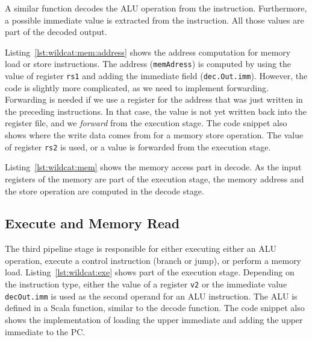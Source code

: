 \documentclass[%
    10pt,
    headinclude, footinclude=false,
    openright, %
    notitlepage,
    cleardoublepage=empty,
    headsepline,
    numbers=noenddot,
    bibliography=totoc, index=totoc,
    ]{scrbook}
\newcommand{\code}[1]{{\lstinline[basicstyle=\small\ttfamily]{#1}}}
\begin{document}

A similar function decodes the ALU operation from the instruction. Furthermore, a possible
immediate value is extracted from the instruction. All those values are part of the
decoded output.

Listing~\ref{lst:wildcat:mem:address} shows the address computation for memory
load or store instructions. The address (\code{memAdress}) is computed by using the value of
register \code{rs1} and adding the immediate field (\code{dec.Out.imm}).
However, the code is slightly more complicated, as we need to implement forwarding.
Forwarding is needed if we use a register for the address that was just written in
the preceding instructions. In that case, the value is not yet written back into the register
file, and we \emph{forward} from the execution stage.
The code snippet also shows where the write data comes from for a memory store operation.
The value of register \code{rs2} is used, or a value is forwarded from the execution
stage.


Listing~\ref{lst:wildcat:mem} shows the memory access part in decode.
As the input registers of the memory are part of the execution stage, the memory address
and the store operation are computed in the decode stage.



 
\subsection{Execute and Memory Read}

The third pipeline stage is responsible for either executing either an ALU operation, execute
a control instruction (branch or jump), or perform a memory load.
Listing~\ref{lst:wildcat:exe} shows part of the execution stage. Depending on the instruction
type, either the value of a register \code{v2} or the immediate value \code{decOut.imm}
is used as the second operand for an ALU instruction. The ALU is defined in a Scala function,
similar to the decode function. The code snippet also shows the implementation of loading the upper
immediate and adding the upper immediate to the PC.
\end{document}
